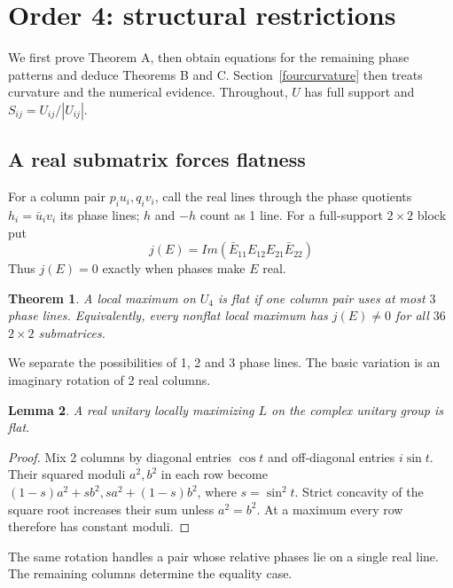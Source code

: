 \documentclass[11pt,a4paper]{article}
\newtheorem{thm}{Theorem}[section]
\newtheorem{lem}[thm]{Lemma}
\begin{document}
\section{Order 4: structural restrictions}\label{orderfour}
We first prove Theorem A, then obtain equations for the remaining phase
patterns and deduce Theorems B and C. Section~\ref{fourcurvature} then treats curvature and the numerical evidence. Throughout, $U$ has full support and
$S_{ij}=U_{ij}/|U_{ij}|$.

\subsection{A real submatrix forces flatness}\label{fourphases}
For a column pair $p_iu_i,q_iv_i$, call the real lines through the
phase quotients $h_i=\bar u_iv_i$ its phase lines; $h$ and $-h$ count
as 1 line. For a full-support $2\times2$ block put
\[
 j(E)=Im(\bar E_{11}E_{12}E_{21}\bar E_{22})
\]
Thus $j(E)=0$ exactly when phases make $E$ real.
\begin{thm}\label{threecase}
A local maximum on $U_4$ is flat if one column pair uses at most $3$
phase lines. Equivalently, every nonflat local maximum has $j(E)\ne0$
for all $36$ $2\times2$ submatrices.
\end{thm}
We separate the possibilities of 1, 2 and 3 phase lines.
The basic variation is an imaginary rotation of 2 real columns.

\begin{lem}\label{realup}
A real unitary locally maximizing $L$ on the complex unitary group is flat.
\end{lem}
\begin{proof}
Mix 2 columns by diagonal entries $\cos t$ and off-diagonal entries
$i\sin t$. Their squared moduli $a^2,b^2$ in each row become
$(1-s)a^2+sb^2,sa^2+(1-s)b^2$, where $s=\sin^2t$.
Strict concavity of the square root increases their sum unless
$a^2=b^2$. At a maximum every row therefore has constant moduli.
\end{proof}
The same rotation handles a pair whose relative phases lie on a
single real line. The remaining columns determine the equality case.
\end{document}
